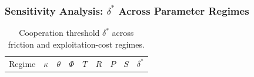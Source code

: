 \documentclass[11pt]{article}
\theoremstyle{plain}
\theoremstyle{definition}
\theoremstyle{remark}
\let\origsubsubsection\subsubsection
\renewcommand{\subsubsection}{\needspace{4\baselineskip}\origsubsubsection}
\begin{document}
\subsubsection{\texorpdfstring{Sensitivity Analysis: \(\delta^*\) Across
Parameter
Regimes}{Sensitivity Analysis: \textbackslash delta\^{}* Across Parameter Regimes}}\label{sensitivity-analysis-delta-star}

\begin{longtable}[]{@{}
  >{\raggedright\arraybackslash}p{}
  >{\raggedright\arraybackslash}p{}
  >{\raggedright\arraybackslash}p{}
  >{\raggedright\arraybackslash}p{}
  >{\raggedright\arraybackslash}p{}
  >{\raggedright\arraybackslash}p{}
  >{\raggedright\arraybackslash}p{}
  >{\raggedright\arraybackslash}p{}
  >{\raggedright\arraybackslash}p{}@{}}
\caption{Cooperation threshold \(\delta^*\) across friction and
exploitation-cost regimes.}\tabularnewline
\toprule\noalign{}
\begin{minipage}[b]{\linewidth}\raggedright
Regime
\end{minipage} & \begin{minipage}[b]{\linewidth}\raggedright
\(\kappa\)
\end{minipage} & \begin{minipage}[b]{\linewidth}\raggedright
\(\theta\)
\end{minipage} & \begin{minipage}[b]{\linewidth}\raggedright
\(\Phi\)
\end{minipage} & \begin{minipage}[b]{\linewidth}\raggedright
\(T\)
\end{minipage} & \begin{minipage}[b]{\linewidth}\raggedright
\(R\)
\end{minipage} & \begin{minipage}[b]{\linewidth}\raggedright
\(P\)
\end{minipage} & \begin{minipage}[b]{\linewidth}\raggedright
\(S\)
\end{minipage} & \begin{minipage}[b]{\linewidth}\raggedright
\(\delta^*\)
\end{minipage} \\

\end{longtable}
\end{document}
